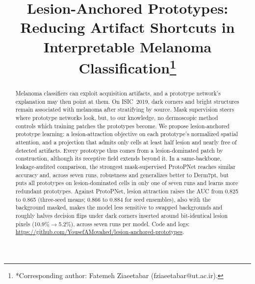 \documentclass[conference]{IEEEtran}
\begin{document}
\title{Lesion-Anchored Prototypes: Reducing Artifact Shortcuts in Interpretable Melanoma Classification\thanks{*Corresponding author: Fatemeh Ziaeetabar (fziaeetabar@ut.ac.ir).}}

\author{
\and
{}
}

\maketitle

\begin{abstract}
Melanoma classifiers can exploit acquisition artifacts, and a prototype network's explanation may then point at them. On ISIC~2019, dark corners and bright structures remain associated with melanoma after stratifying by source. Mask supervision steers where prototype networks look, but, to our knowledge, no dermoscopic method controls which training patches the prototypes become. We propose lesion-anchored prototype learning: a lesion-attraction objective on each prototype's normalized spatial attention, and a projection that admits only cells at least half lesion and nearly free of detected artifacts. Every prototype thus comes from a lesion-dominated patch by construction, although its receptive field extends beyond it. In a same-backbone, leakage-audited comparison, the strongest mask-supervised ProtoPNet reaches similar accuracy and, across seven runs, robustness and generalizes better to Derm7pt, but puts all prototypes on lesion-dominated cells in only one of seven runs and learns more redundant prototypes. Against ProtoPNet, lesion attraction raises the AUC from 0.825 to 0.865 (three-seed means; 0.866 to 0.884 for seed ensembles), also with the background masked, makes the model less sensitive to swapped backgrounds and roughly halves decision flips under dark corners inserted around bit-identical lesion pixels (10.9\%$\rightarrow$5.2\%), across seven runs per model. Code and logs: \url{https://github.com/YousefAMovahed/lesion-anchored-prototypes}.
\end{abstract}
\end{document}

